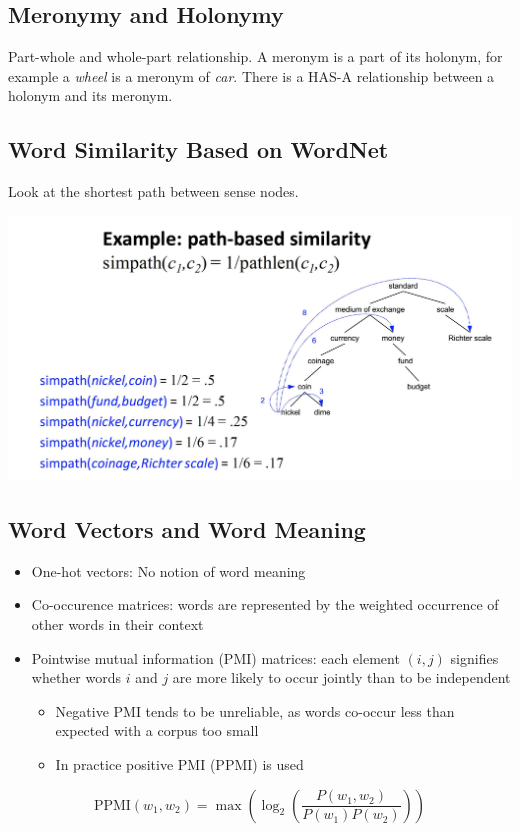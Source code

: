 \documentclass[11pt]{article}
\begin{document}
\subsection{Meronymy and Holonymy}
Part-whole and whole-part relationship. A meronym is a part of its holonym, for example a \textit{wheel} is a meronym of \textit{car}. There is a HAS-A relationship between a holonym and its meronym.

\subsection{Word Similarity Based on WordNet}
Look at the shortest path between sense nodes.
\begin{center}
	\includegraphics[width=0.8\linewidth]{img/WordNet_similarity}
\end{center}

\subsection{Word Vectors and Word Meaning}
\begin{itemize}
	\item One-hot vectors: No notion of word meaning
	\item Co-occurence matrices: words are represented by the weighted occurrence of other words in their context
	\item Pointwise mutual information (PMI) matrices: each element $(i,j)$ signifies whether words $i$ and $j$ are more likely to occur jointly than to be independent
	\begin{itemize}
		\item Negative PMI tends to be unreliable, as words co-occur less than expected with a corpus too small
		\item In practice positive PMI (PPMI) is used
	\end{itemize}
\end{itemize}
\begin{equation*}
	\text{PPMI}(w_1,w_2) = \max{\left(\log_2{\left(\frac{P(w_1,w_2)}{P(w_1)P(w_2)}\right)}\right)}
\end{equation*}
\end{document}

